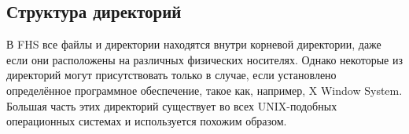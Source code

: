 \subsection{Структура директорий}

В FHS все файлы и директории находятся внутри корневой директории, даже если они расположены на различных физических носителях. Однако некоторые из директорий могут присутствовать только в случае, если установлено определённое программное обеспечение, такое как, например, X Window System. Большая часть этих директорий существует во всех UNIX-подобных операционных системах и используется похожим образом.
